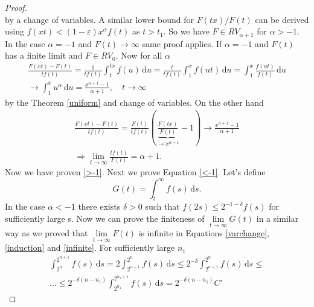 \documentclass[english,12pt,a4paper,pdftex,sci,utf8]{aaltothesis} %
\begin{document}
\begin{proof}
\begin{equation*}
\end{equation*}
by a change of variables. A similar lower bound for $F(tx)/F(t)$ can be derived using $f(xt)<(1-\varepsilon)x^{\alpha}f(t)$ as $t > t_1$. So we have $F \in RV_{\alpha+1}$ for $\alpha>-1$. In the case $\alpha=-1$ and $F(t) \rightarrow \infty$ same proof applies. If $\alpha=-1$ and $F(t)$ has a finite limit and $F \in RV_0$. Now for all $\alpha$
\begin{equation*}
\begin{split}
\frac{F(xt)-F(t)}{tf(t)} = \frac{1}{tf(t)} \int_{t}^{tx}f(u)\, \mathrm{d}u = \frac{t}{tf(t)} \int_{1}^{x} f(ut)\, \mathrm{d}u = \int_1^x \frac{f(ut)}{f(t)}\, \mathrm{d}u \\
\rightarrow \int_1^x u^{\alpha}\, \mathrm{d}u = \frac{x^{\alpha+1}-1}{\alpha+1}, \quad t \rightarrow \infty
\end{split}
\end{equation*}
by the Theorem \ref{uniform} and change of variables. On the other hand 
\begin{equation*}
\begin{split}
\frac{F(xt)-F(t)}{tf(t)} = \frac{F(t)}{tf(t)}\left(\underbrace{\frac{F(tx)}{F(t)}}_{\rightarrow x^{\alpha+1}} - 1\right) \rightarrow \frac{x^{\alpha+1}-1}{\alpha+1} \\
\Rightarrow \lim_{t \rightarrow \infty} \frac{tf(t)}{F(t)}= \alpha + 1.
\end{split}
\end{equation*}
Now we have proven \eqref{>-1}. Next we prove Equation \eqref{<-1}. Let's define
\begin{equation*}
G(t) = \int_{t}^{\infty} f(s)\,\mathrm{d}s.
\end{equation*}
In the case $\alpha<-1$ there exists $\delta>0$ such that $f(2s) \leq 2^{-1-\delta}f(s)$ for sufficiently large s. Now we can prove the finiteness of $\lim\limits_{t \rightarrow \infty} G(t)$ in a similar way as we proved that $\lim\limits_{t \rightarrow \infty} F(t)$ is infinite in Equations \eqref{varchange}, \eqref{induction} and \eqref{infinite}. For sufficiently large $n_1$
\begin{equation*}
\begin{split}
\int_{2^{n}}^{2^{n+1}} f(s)\,\mathrm{d}s = 2 \int_{2^{n-1}}^{2^{n}} f(s)\,\mathrm{d}s \leq 2^{-\delta} \int_{2^{n-1}}^{2^n} f(s)\,\mathrm{d}s \leq \\ ... \leq 2^{-\delta(n-n_1)} \int_{2^{n_1}}^{2^{n_1+1}} f(s)\,\mathrm{d}s = 2^{-\delta(n-n_1)} C'
\end{split}
\end{equation*}

\end{proof}
\end{document}
